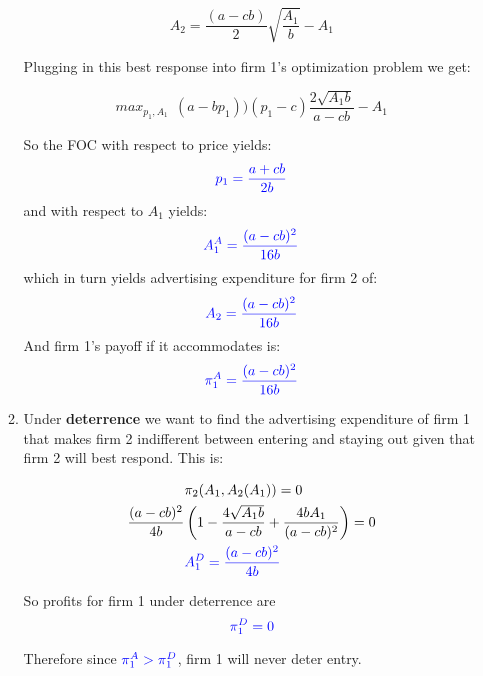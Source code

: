 \documentclass[12pt,english]{article}
\begin{document}
\begin{enumerate}
\begin{enumerate}
\[
A_{2}=\frac{(a-cb)}{2}\sqrt{\frac{A_{1}}{b}}-A_{1}
\]

Plugging in this best response into firm 1's optimization problem we get:

\[
max_{p_{1}, A_{1}}\ \ (a-bp_{1}))(p_{1}-c)\frac{2\sqrt{A_{1}b}}{a-cb}-A_{1}
\]

So the FOC with respect to price yields:
\[
\textcolor{blue}{p_{1}=\frac{a+cb}{2b}}
\]
and with respect to $A_{1}$ yields:
\[
\textcolor{blue}{A_{1}^{A}=\frac{(a-cb)^{2}}{16b}}
\]
which in turn yields advertising expenditure for firm 2 of:
\[
\textcolor{blue}{A_{2}=\frac{(a-cb)^{2}}{16b}}
\]
And firm 1's payoff if it accommodates is:
\[
\textcolor{blue}{\pi_{1}^{A}=\frac{(a-cb)^{2}}{16b}}
\]

\item Under \textbf{deterrence} we want to find the advertising expenditure of firm 1 that makes firm 2 indifferent between entering and staying out given that firm 2 will best respond. This is:

\begin{align}
&\pi_{2}(A_{1}, A_{2}(A_{1}))=0\nonumber\\
\frac{(a-cb)^{2}}{4b}&\left(1-\frac{4\sqrt{A_{1}b}}{a-cb}+\frac{4bA_{1}}{(a-cb)^{2}} \right)=0\nonumber\\
&\textcolor{blue}{A_{1}^{D}=\frac{(a-cb)^{2}}{4b}}\nonumber
\end{align}

So profits for firm 1 under deterrence are
\[
\textcolor{blue}{\pi_{1}^{D}=0}
\]

Therefore since $\textcolor{blue}{\pi_{1}^{A}>\pi_{1}^{D}}$, firm 1 will never deter entry.

\end{enumerate} 

\end{enumerate}
\end{document}

